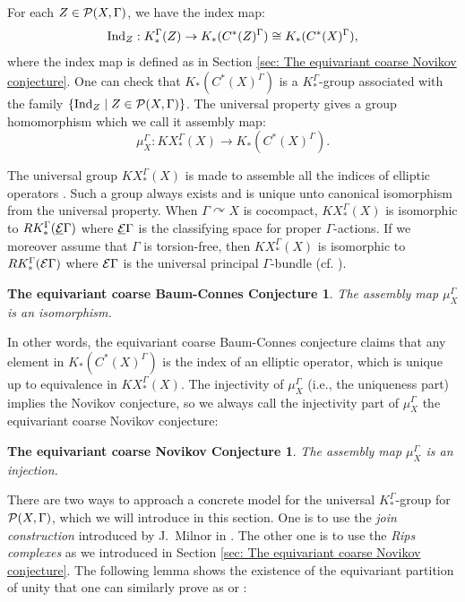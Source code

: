 \documentclass[11pt]{article}
\theoremstyle{definition}
\theoremstyle{plain}
\newtheorem*{ECBCcon}{The equivariant coarse Baum-Connes Conjecture}
\newtheorem*{ECNcon}{The equivariant coarse Novikov Conjecture}
\def\ind{\textup{Ind}}
\def\EG{\underline{\E}\Gamma}
\def\Ga{\Gamma}
\def\car{\curvearrowright}
\begin{document}
For each $Z\in\P(X,\Ga)$, we have the index map:
$$\ind_Z:K_*^{\Ga}(Z)\to K_*(C^*(Z)^{\Ga})\cong K_*(C^*(X)^{\Ga}),$$
where the index map is defined as in Section \ref{sec: The equivariant coarse Novikov conjecture}. One can check that $K_*(C^*(X)^{\Ga})$ is a $K^{\Ga}_*$-group associated with the family $\{\ind_Z\mid Z\in\P(X,\Ga)\}$. The universal property gives a group homomorphism which we call it assembly map:
$$\mu_{X}^{\Ga}:KX^{\Ga}_*(X)\to K_*(C^*(X)^{\Ga}).$$

The universal group $KX^{\Ga}_*(X)$ is made to assemble all the indices of elliptic operators \cite{BCH1994}. Such a group always exists \cite[Lemma 7.1.6]{HIT2020} and is unique unto canonical isomorphism from the universal property. When $\Ga\car X$ is cocompact, $KX_*^{\Ga}(X)$ is isomorphic to $RK^{\Ga}_*(\EG)$ where $\EG$ is the classifying space for proper $\Ga$-actions. If we moreover assume that $\Ga$ is torsion-free, then $KX_*^{\Ga}(X)$ is isomorphic to $RK^{\Ga}_*(\E\Ga)$ where $\E\Ga$ is the universal principal $\Ga$-bundle (cf. \cite{GTM20}).

\begin{ECBCcon}
The assembly map $\mu_{X}^{\Ga}$ is an isomorphism.
\end{ECBCcon}

In other words, the equivariant coarse Baum-Connes conjecture claims that any element in $K_*(C^*(X)^{\Ga})$ is the index of an elliptic operator, which is unique up to equivalence in $KX^{\Ga}_*(X)$. The injectivity of $\mu_X^{\Ga}$ (i.e., the uniqueness part) implies the Novikov conjecture, so we always call the injectivity part of $\mu_X^{\Ga}$ the equivariant coarse Novikov conjecture:

\begin{ECNcon}
The assembly map $\mu_{X}^{\Ga}$ is an injection.
\end{ECNcon}

There are two ways to approach a concrete model for the universal $K^{\Ga}_*$-group for $\P(X,\Ga)$, which we will introduce in this section. One is to use the \emph{join construction} introduced by J.~Milnor in \cite{Milnor56}. The other one is to use the \emph{Rips complexes} as we introduced in Section \ref{sec: The equivariant coarse Novikov conjecture}. 
The following lemma shows the existence of the equivariant partition of unity that one can similarly prove as \cite[Corollary A.2.8]{HIT2020} or \cite[Proposition 4.12.1]{GTM20}:
\end{document}
